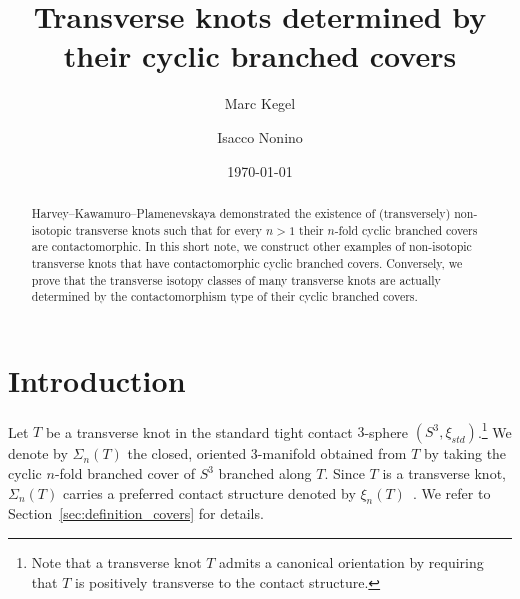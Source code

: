 \documentclass[11pt]{amsart}
\theoremstyle{definition}
\theoremstyle{definition}
\theoremstyle{definition}
\theoremstyle{definition}
\begin{document}
\title{Transverse knots determined by their cyclic branched covers}
\author{Marc Kegel}
\address{Universidad de Sevilla, Dpto.\ de Álgebra,
Avda.\ Reina Mercedes s/n,
41012 Sevilla}
\author{Isacco Nonino}
\address{University of Glasgow,
School of Mathematics and Statistics}
\date{\today }

\begin{abstract}
 Harvey--Kawamuro--Plamenevskaya demonstrated the existence of (transversely) non-isotopic transverse knots such that for every $n>1$ their $n$-fold cyclic branched covers are contactomorphic. In this short note, we construct other examples of non-isotopic transverse knots that have contactomorphic cyclic branched covers. Conversely, we prove that the transverse isotopy classes of many transverse knots are actually determined by the contactomorphism type of their cyclic branched covers.  
\end{abstract}


\makeatletter
{}
\makeatother%



\maketitle

\section{Introduction}

Let $T$ be a transverse knot in the standard tight contact $3$-sphere $(S^3,\xi_{std})$.\footnote{Note that a transverse knot $T$ admits a canonical orientation by requiring that $T$ is positively transverse to the contact structure.} We denote by $\Sigma_n(T)$ the closed, oriented $3$-manifold obtained from $T$ by taking the cyclic $n$-fold branched cover of $S^3$ branched along $T$. Since $T$ is a transverse knot, $\Sigma_n(T)$ carries a preferred contact structure denoted by $\xi_n(T)$~\cite{Gonzalo,Geiges}. We refer to Section~\ref{sec:definition_covers} for details.
\end{document}
